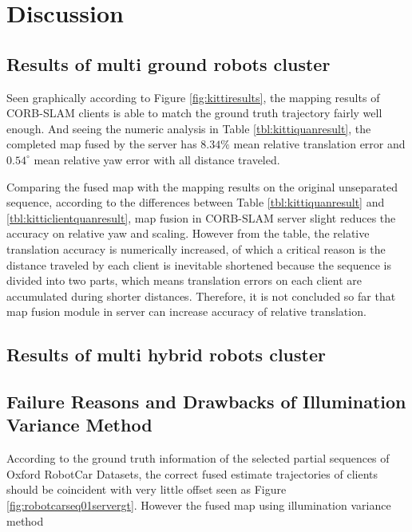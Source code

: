 
\chapter{Discussion}

\section{Results of multi ground robots cluster}
\label{sec:disussmultiground}
Seen graphically according to Figure \ref{fig:kittiresults}, the mapping results of CORB-SLAM clients is able to match the ground truth trajectory fairly well enough. And seeing the numeric analysis in Table \ref{tbl:kittiquanresult}, the completed map fused by the server has $8.34\%$ mean relative translation error and $0.54^\circ$ mean relative yaw error with all distance traveled.

Comparing the fused map with the mapping results on the original unseparated sequence, according to the differences between Table \ref{tbl:kittiquanresult} and \ref{tbl:kitticlientquanresult}, map fusion in CORB-SLAM server slight reduces the accuracy on relative yaw and scaling. However from the table, the relative translation accuracy is numerically increased, of which a critical reason is the distance traveled by each client is inevitable shortened because the sequence is divided into two parts, which means translation errors on each client are accumulated during shorter distances. Therefore, it is not concluded so far that map fusion module in server can increase accuracy of relative translation.

\section{Results of multi hybrid robots cluster}
\label{sec:disussmultihybrid}

\section{Failure Reasons and Drawbacks of Illumination Variance Method}
\label{sec:discusslifelong}

According to the ground truth information of the selected partial sequences of Oxford RobotCar Datasets, the correct fused estimate trajectories of clients should be coincident with very little offset seen as Figure \ref{fig:robotcarseq01servergt}. However the fused map using illumination variance method 

\newpage
